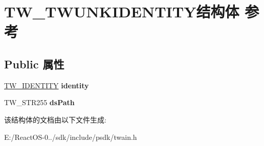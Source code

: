 \hypertarget{struct_t_w___t_w_u_n_k_i_d_e_n_t_i_t_y}{}\section{T\+W\+\_\+\+T\+W\+U\+N\+K\+I\+D\+E\+N\+T\+I\+T\+Y结构体 参考}
\label{struct_t_w___t_w_u_n_k_i_d_e_n_t_i_t_y}
\subsection*{Public 属性}
\begin{DoxyCompactItemize}
\item 
\mbox{\label{struct_t_w___t_w_u_n_k_i_d_e_n_t_i_t_y_aaad56fc63a6717beab92c7e25927838c}} 
\hyperlink{struct_t_w___i_d_e_n_t_i_t_y}{T\+W\+\_\+\+I\+D\+E\+N\+T\+I\+TY} {\bfseries identity}
\item 
\mbox{\label{struct_t_w___t_w_u_n_k_i_d_e_n_t_i_t_y_adf67a1ead7815137a87515040a1cbe65}} 
T\+W\+\_\+\+S\+T\+R255 {\bfseries ds\+Path}
\end{DoxyCompactItemize}


该结构体的文档由以下文件生成\+:\begin{DoxyCompactItemize}
\item 
E\+:/\+React\+O\+S-\/0../sdk/include/psdk/twain.\+h\end{DoxyCompactItemize}

